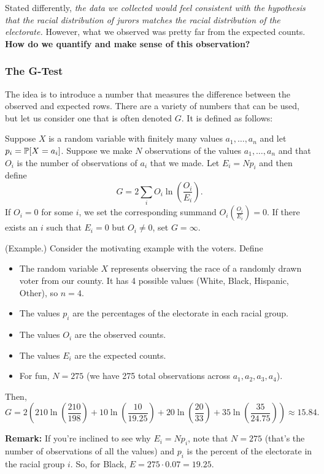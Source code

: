 \documentclass[letterpaper]{article}
\begin{document}
\bigskip 

Stated differently, \emph{the data we collected would feel consistent with the hypothesis that the racial distribution of jurors matches the racial distribution of the electorate.} However, what we observed was pretty far from the expected counts. \textbf{How do we quantify and make sense of this observation?}

\subsubsection{The G-Test}
The idea is to introduce a number that measures the difference between the observed and expected rows. There are a variety of numbers that can be used, but let us consider one that is often denoted $G$. It is defined as follows: 

\begin{definition}{}{}
    Suppose $X$ is a random variable with finitely many values $a_1, \hdots, a_n$ and let $p_i = \mathbb{P}[X = a_i]$. Suppose we make $N$ observations of the values $a_1, \hdots, a_n$ and that $O_i$ is the number of observations of $a_i$ that we made. Let $E_i = Np_i$ and then define \[G = 2\sum_{i} O_i \ln\left(\frac{O_i}{E_i}\right).\] If $O_i = 0$ for some $i$, we set the corresponding summand $O_i\left(\frac{O_i}{E_i}\right) = 0$. If there exists an $i$ such that $E_i = 0$ but $O_i \neq 0$, set $G = \infty$. 
\end{definition}

\begin{mdframed}
    (Example.) Consider the motivating example with the voters. Define 
    \begin{itemize}
        \item The random variable $X$ represents observing the race of a randomly drawn voter from our county. It has 4 possible values (White, Black, Hispanic, Other), so $n = 4$. 
        
        \item The values $p_i$ are the percentages of the electorate in each racial group. 
        \item The values $O_i$ are the observed counts. 
        
        \item The values $E_i$ are the expected counts. 
        
        \item For fun, $N = 275$ (we have 275 total observations across $a_1, a_2, a_3, a_4$). 
    \end{itemize}
    Then, 
    \[G = 2\left(210 \ln\left(\frac{210}{198}\right) + 10 \ln\left(\frac{10}{19.25}\right) + 20 \ln\left(\frac{20}{33}\right) + 35\ln\left(\frac{35}{24.75}\right)\right) \approx 15.84.\]
\end{mdframed}
\textbf{Remark:} If you're inclined to see why $E_i = Np_i$, note that $N = 275$ (that's the number of observations of all the values) and $p_i$ is the percent of the electorate in the racial group $i$. So, for Black, $E = 275 \cdot 0.07 = 19.25$. 
\end{document}
